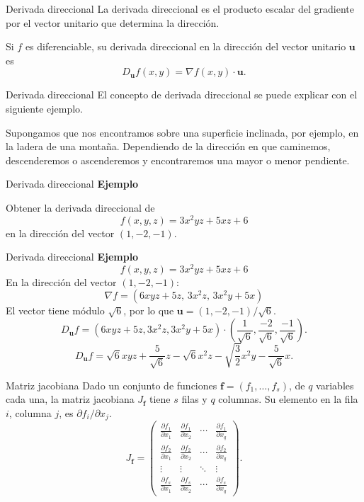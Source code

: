 \documentclass[original_version/main.tex]{subfiles}
\begin{document}
\begin{frame}{Derivada direccional}
La derivada direccional es el producto escalar del gradiente por el vector unitario que determina la dirección.
\medskip

Si $f$ es diferenciable, su derivada direccional en la dirección del vector unitario $\mathbf u$ es
\[D_{\mathbf u}f(x,y)=\nabla f(x,y)\cdot\mathbf u.\]
\end{frame}
\begin{frame}{Derivada direccional}
El concepto de derivada direccional se puede explicar con el siguiente ejemplo.
\medskip

Supongamos que nos encontramos sobre una superficie inclinada, por ejemplo, en la ladera de una montaña. Dependiendo de la dirección en que caminemos, descenderemos o ascenderemos y encontraremos una mayor o menor pendiente.
\end{frame}
\begin{frame}{Derivada direccional}
\textbf{Ejemplo}\par Obtener la derivada direccional de\[f(x,y,z)=3x^2yz+5xz+6\]
en la dirección del vector $(1,-2,-1)$.
\end{frame}
\begin{frame}{Derivada direccional}
\small\textbf{Ejemplo}\[f(x,y,z)=3x^2yz+5xz+6\]
En la dirección del vector $(1,-2,-1)$:
\[\nabla f=(6xyz+5z,\,3x^2z,\,3x^2y+5x)\]
El vector tiene módulo $\sqrt6$, por lo que $\mathbf u=(1,-2,-1)/\sqrt6$.
\[D_{\mathbf u}f=(6xyz+5z,3x^2z,3x^2y+5x)\cdot\left(\frac1{\sqrt6},\frac{-2}{\sqrt6},\frac{-1}{\sqrt6}\right).\]
\[D_{\mathbf u}f=\sqrt6xyz+\frac5{\sqrt6}z-\sqrt6x^2z-\sqrt{\frac32}x^2y-\frac5{\sqrt6}x.\]
\end{frame}
\begin{frame}{Matriz jacobiana}
\small Dado un conjunto de funciones $\mathbf f=(f_1,\ldots,f_s)$, de $q$ variables cada una, la matriz jacobiana $J_{\mathbf f}$ tiene $s$ filas y $q$ columnas. Su elemento en la fila $i$, columna $j$, es $\partial f_i/\partial x_j$.
\[J_{\mathbf f}=\begin{pmatrix}
\frac{\partial f_1}{\partial x_1}&\frac{\partial f_1}{\partial x_2}&\cdots&\frac{\partial f_1}{\partial x_q}\\
\frac{\partial f_2}{\partial x_1}&\frac{\partial f_2}{\partial x_2}&\cdots&\frac{\partial f_2}{\partial x_q}\\
\vdots&\vdots&\ddots&\vdots\\
\frac{\partial f_s}{\partial x_1}&\frac{\partial f_s}{\partial x_2}&\cdots&\frac{\partial f_s}{\partial x_q}
\end{pmatrix}.\]
\end{frame}
\end{document}
